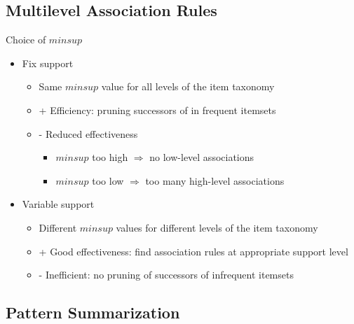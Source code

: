 \documentclass{article}
\begin{document}
\subsection{Multilevel Association Rules}
Choice of $minsup$
\begin{itemize} 
  \item Fix support
  \begin{itemize} 
    \item Same $minsup$ value for all levels of the item taxonomy
    \item + Efficiency: pruning successors of in frequent itemsets
    \item - Reduced effectiveness
    \begin{itemize} 
      \item $minsup$ too high $\Rightarrow$ no low-level associations 
      \item $minsup$ too low $\Rightarrow$ too many high-level associations
    \end{itemize}
  \end{itemize}

  \item Variable support
  \begin{itemize} 
    \item Different $minsup$ values for different levels of the item taxonomy
    \item + Good effectiveness: find association rules at appropriate support level
    \item - Inefficient: no pruning of successors of infrequent itemsets
  \end{itemize}
\end{itemize}
\newpage

\subsection{Pattern Summarization}
\end{document}
